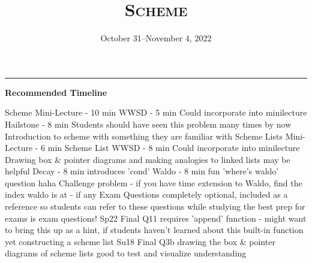 \documentclass{exam}
\title{\textsc{Scheme}}
\date{October 31--November 4, 2022}
\begin{document}
\maketitle
\rule{\textwidth}{0.15em}
\fontsize{12}{15}\selectfont

\begin{guide}
\begin{blocksection}
\textbf{Recommended Timeline}
\begin{outline}[enumerate]
  \1 Scheme Mini-Lecture - 10 min
  \1 WWSD - 5 min
  \2 Could incorporate into minilecture
  \1 Hailstone - 8 min
  \2 Students should have seen this problem many times by now
  \2 Introduction to scheme with something they are familiar with
  \1 Scheme Lists Mini-Lecture - 6 min
  \1 Scheme List WWSD - 8 min
  \2 Could incorporate into minilecture
  \2 Drawing box \& pointer diagrams and making analogies to linked lists may be helpful
  \1 Decay - 8 min
  \2 introduces 'cond'
  \1 Waldo - 8 min
  \2 fun 'where's waldo' question haha
  \1 Challenge problem - if you have time
  \2 extension to Waldo, find the index waldo is at - if any
  \1 Exam Questions
  \2 completely optional, included as a reference so students can refer to these questions while studying
  \2 the best prep for exams is exam questions!
  \2 Sp22 Final Q11
  \3 requires 'append' function - might want to bring this up as a hint, if students haven't learned about this built-in function yet
  \3 constructing a scheme list
  \2 Su18 Final Q3b
  \3 drawing the box \& pointer diagrams of scheme lists
  \3 good to test and visualize understanding
\end{outline}
\end{blocksection}
\end{guide}
\end{document}
